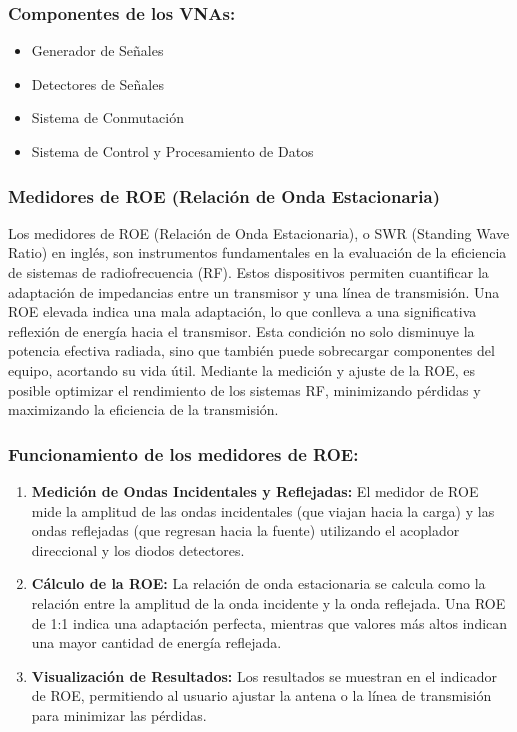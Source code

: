        \subsubsection*{Componentes de los VNAs:}

            \begin{itemize}
                \item Generador de Señales
                \item Detectores de Señales
                \item Sistema de Conmutación
                \item Sistema de Control y Procesamiento de Datos
            \end{itemize}


        \subsubsection{Medidores de ROE (Relación de Onda Estacionaria)}

            Los medidores de ROE (Relación de Onda Estacionaria), o SWR (Standing Wave Ratio) en inglés, son instrumentos fundamentales en la evaluación de la eficiencia de sistemas de radiofrecuencia (RF). Estos dispositivos permiten cuantificar la adaptación de impedancias entre un transmisor y una línea de transmisión. Una ROE elevada indica una mala adaptación, lo que conlleva a una significativa reflexión de energía hacia el transmisor. Esta condición no solo disminuye la potencia efectiva radiada, sino que también puede sobrecargar componentes del equipo, acortando su vida útil. Mediante la medición y ajuste de la ROE, es posible optimizar el rendimiento de los sistemas RF, minimizando pérdidas y maximizando la eficiencia de la transmisión.

        \subsubsection*{Funcionamiento de los medidores de ROE:}

            \begin{enumerate}
                \item \textbf{Medición de Ondas Incidentales y Reflejadas:} El medidor de ROE mide la amplitud de las ondas incidentales (que viajan hacia la carga) y las ondas reflejadas (que regresan hacia la fuente) utilizando el acoplador direccional y los diodos detectores.
                \item \textbf{Cálculo de la ROE:} La relación de onda estacionaria se calcula como la relación entre la amplitud de la onda incidente y la onda reflejada. Una ROE de 1:1 indica una adaptación perfecta, mientras que valores más altos indican una mayor cantidad de energía reflejada.
                \item \textbf{Visualización de Resultados:} Los resultados se muestran en el indicador de ROE, permitiendo al usuario ajustar la antena o la línea de transmisión para minimizar las pérdidas.
            \end{enumerate}

